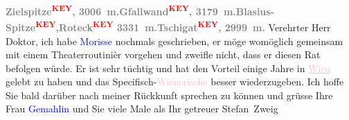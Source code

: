 \pstart
           \noindent{}\centering{}\textcolor{gray}{\textbf{Zielspitze\textcolor{red}{\textsuperscript{\textbf{KEY}}}, 3006 m.\hspace*{2em}Gfallwand\textcolor{red}{\textsuperscript{\textbf{KEY}}}, 3179 m.\hspace*{2em}Blasius-Spitze\textcolor{red}{\textsuperscript{\textbf{KEY}}},\hspace*{2em}Roteck\textcolor{red}{\textsuperscript{\textbf{KEY}}} 3331 m.\hspace*{2em}Tschigat\textcolor{red}{\textsuperscript{\textbf{KEY}}}, 2999 m.}}\pend
           {\vspace{1\baselineskip}}
\pstart
           \noindent{}{\pb}Verehrter Herr Doktor, ich habe \textcolor{blue}{Morisse}{}\ledrightnote{\textcolor{blue}{Paul Morisse}} nochmals geschrieben, er möge \label{K_L03629-2v}\label{K_L03629-2h} womöglich gemeinsam mit einem
               Theaterroutinièr vorgehen und zweifle nicht, dass er diesen Rat befolgen würde. Er
               ist sehr tüchtig und hat den Vorteil einige Jahre in \textcolor{pink}{\uline{Wien}}{}\ledrightnote{\textcolor{pink}{Wien}} gelebt zu haben und das Specifisch-\textcolor{pink}{Wienerische}{}\ledrightnote{\textcolor{pink}{Wien}} besser wiederzugeben. Ich hoffe Sie bald darüber nach {\pb}meiner Rückkunft sprechen zu können und
               grüsse Ihre Frau \textcolor{blue}{Gemahlin}{}\ledrightnote{{$\rightarrow$}\textcolor{blue}{Olga Schnitzler}} und
               Sie viele Male als Ihr getreuer\pend
           \pstart \spacefill\mbox{Stefan Zweig}\pend{}\endnumbering{}
\begin{anhang}
\end{anhang}
      